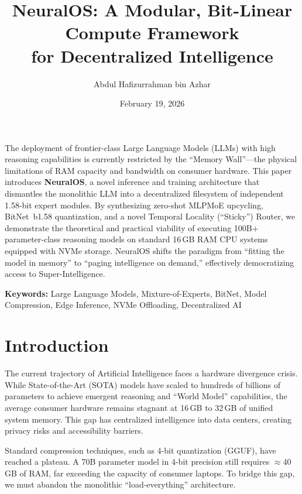 \documentclass[11pt,twocolumn]{article}
\title{%
    \textbf{NeuralOS: A Modular, Bit-Linear Compute Framework\\
    for Decentralized Intelligence}
}
\author{
    Abdul Hafizurrahman bin Azhar
}
\date{February 19, 2026}
\begin{document}
\maketitle

\begin{onecolabstract}
The deployment of frontier-class Large Language Models (LLMs) with high reasoning capabilities is currently restricted by the ``Memory Wall''---the physical limitations of RAM capacity and bandwidth on consumer hardware. This paper introduces \textbf{NeuralOS}, a novel inference and training architecture that dismantles the monolithic LLM into a decentralized filesystem of independent 1.58-bit expert modules. By synthesizing zero-shot MLPMoE upcycling, BitNet~b1.58 quantization, and a novel Temporal Locality (``Sticky'') Router, we demonstrate the theoretical and practical viability of executing 100B+ parameter-class reasoning models on standard 16\,GB RAM CPU systems equipped with NVMe storage. NeuralOS shifts the paradigm from ``fitting the model in memory'' to ``paging intelligence on demand,'' effectively democratizing access to Super-Intelligence.
\end{onecolabstract}

\vspace{0.5em}
\noindent\textbf{Keywords:} Large Language Models, Mixture-of-Experts, BitNet, Model Compression, Edge Inference, NVMe Offloading, Decentralized AI

\section{Introduction}

The current trajectory of Artificial Intelligence faces a hardware divergence crisis. While State-of-the-Art (SOTA) models have scaled to hundreds of billions of parameters to achieve emergent reasoning and ``World Model'' capabilities, the average consumer hardware remains stagnant at 16\,GB to 32\,GB of unified system memory. This gap has centralized intelligence into data centers, creating privacy risks and accessibility barriers.

Standard compression techniques, such as 4-bit quantization (GGUF), have reached a plateau. A 70B parameter model in 4-bit precision still requires ${\approx}40$\,GB of RAM, far exceeding the capacity of consumer laptops. To bridge this gap, we must abandon the monolithic ``load-everything'' architecture.
\end{document}
